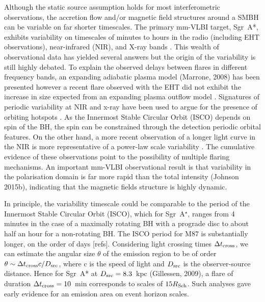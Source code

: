 Although the static source assumption holds for most interferometric observations, the accretion flow and/or magnetic field structures around a SMBH can be variable on far shorter timescales. The primary mm-VLBI target, Sgr~A*,  exhibits variability on timescales of minutes to hours in the radio (including EHT observations), near-infrared (NIR), and X-ray bands \citep[e.g.][]{Baganoff_2001, Genzel_2003, Yusef-Zadeh_2006, Maronne_2006, Fish_2011, Johnson_2015b}. This wealth of observational data has yielded several answers but the origin of the variability is still highly debated. To explain the observed delays between flares in different frequency bands, an expanding adiabatic plasma model (Marrone, 2008) has been presented however a recent flare observed with the EHT did not exhibit the increase in size expected from an expanding plasma outflow model \cite{Fish_2011}.  Signatures of periodic variability at NIR and x-ray \citep{Genzel_2003; Belanger_2006} have been used to argue for the presence of orbiting hotspots \cite{Doeleman_2009}. As the Innermost Stable Circular Orbit (ISCO) depends on spin of the BH, the spin can be constrained through the detection periodic orbital features. On the other hand, a more recent observation of a longer light curve in the NIR is more representative of a power-law scale variability \cite{Meyer_2008}. The cumulative evidence of these observations point to the possibility of multiple flaring mechanisms. An important mm-VLBI observational result is that variability in the polarisation domain is far more rapid than the total intensity (Johnson 2015b), indicating that the magnetic fields structure is highly dynamic.


In principle, the variability timescale could be comparable to the period of the Innermost Stable Circular Orbit (ISCO), which for Sgr~A$^\star$, ranges from 4 minutes in the case of a maximally rotating BH with a prograde disc to about half an hour for a non-rotating BH. The ISCO period for M87 is substantially longer, on the order of days [refs]. Considering light crossing times $\Delta t_{\rm cross}$, we can estimate the angular size $\theta$ of the emission region to be of order $\theta \sim \Delta t_{\rm cross} c /D_{\rm src}$, where c is the speed of light and $D_{\rm src}$ is the observer-source distance. Hence for Sgr~A* at $D_{\rm src} = 8.3$~kpc (Gillessen, 2009), a flare of duration $ \Delta t_{\rm cross} =10$~min corresponds to scales of  $15 R_{\rm Sch}$. Such analyses gave early evidence for an emission area on event horizon scales.



